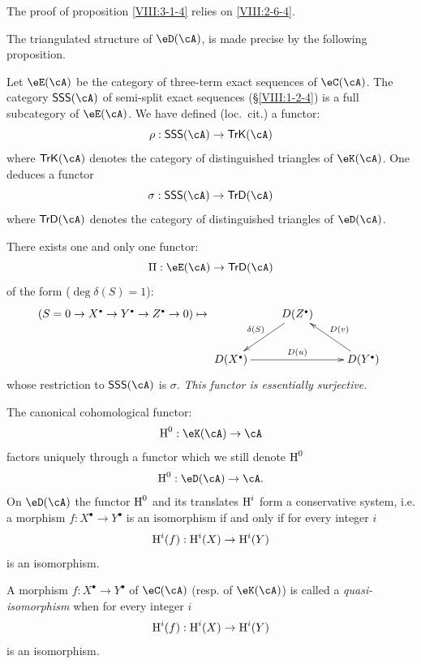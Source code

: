 The proof of proposition \ref{VIII:3-1-4} relies on
\ref{VIII:2-6-4}.

The triangulated structure of $\eD(\cA)$, is made precise by the following
proposition.

Let $\eE(\cA)$ be the category of three-term exact sequences of
$\eC(\cA)$. The category $\mathsf{SSS}(\cA)$ of semi-split exact
sequences (\S\ref{VIII:1-2-4}) is a full subcategory of
$\eE(\cA)$. We have defined (loc.\ cit.) a functor:
\[
  \rho:\mathsf{SSS}(\cA) \to \mathsf{TrK}(\cA)
\]
where $\mathsf{TrK}(\cA)$ denotes the category of distinguished triangles
of $\eK(\cA)$. One deduces a functor
\[
  \sigma : \mathsf{SSS}(\cA) \to \mathsf{TrD}(\cA)
\]
where $\mathsf{TrD}(\cA)$ denotes the category of distinguished triangles
of $\eD(\cA)$. 





\begin{proposition}\label{VIII:3-1-5}
There exists one and only one functor:
\[
  \Pi:\eE(\cA) \to \mathsf{TrD}(\cA)
\]
of the form ($\deg \delta(S)=1$): 
\[
(S=0 \to X^\bullet \to Y^\bullet \to Z^\bullet \to 0) 
\mapsto 
\xymatrix{
  & D(Z^\bullet) \ar[dl]_-{\delta(S)} \\
  D(X^\bullet) \ar[rr]^-{D(u)} 
    & & D(Y^\bullet) \ar[ul]_-{D(v)} 
}
\]
whose restriction to $\mathsf{SSS}(\cA)$ is $\sigma$. \emph{This functor
is essentially surjective.}
\end{proposition}





\begin{proposition}\label{VIII:3-1-6}
The canonical cohomological functor:
\[
  \h^0:\eK(\cA) \to \cA
\]
factors uniquely through a functor which we still denote
$\operatorname{H}^0$
\[
  \h^0:\eD(\cA) \to \cA \text{.}
\]
On $\eD(\cA)$ the functor $\operatorname{H}^0$ and its translates $\operatorname{H}^i$ form a
conservative system, i.e. a morphism $f:X^\bullet \to Y^\bullet$ is an
isomorphism if and only if for every integer $i$
\[
  \operatorname{H}^i(f):\operatorname{H}^i(X) \to \operatorname{H}^i(Y)
\]
is an isomorphism.
\end{proposition}





\begin{definition}\label{VIII:3-1-7}
A morphism $f:X^\bullet \to Y^\bullet$ of $\eC(\cA)$ (resp. of $\eK(\cA)$)
is called a \emph{quasi-isomorphism} when for every integer $i$
\[
  \operatorname{H}^i(f):\operatorname{H}^i(X) \to \operatorname{H}^i(Y)
\]
is an isomorphism.
\end{definition}

